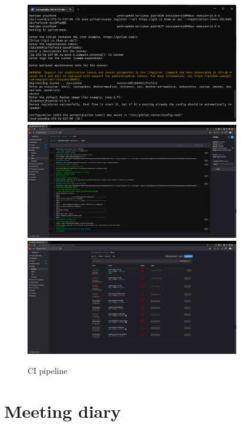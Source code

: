 \documentclass[a4paper]{article}
\begin{document}
\begin{figure}[H] %
	\centering %
	\includegraphics[width=0.84\textwidth]{./images/pipeline_install_gitlab_runner.png}
	\includegraphics[width=0.84\textwidth]{./images/pipeline_work.png}
	\includegraphics[width=0.84\textwidth]{./images/pipeline_success.png} %
	\caption*{CI pipeline} %
	\label{Fig.main2} %
\end{figure}

\newpage

\section{Meeting diary}
\end{document}
